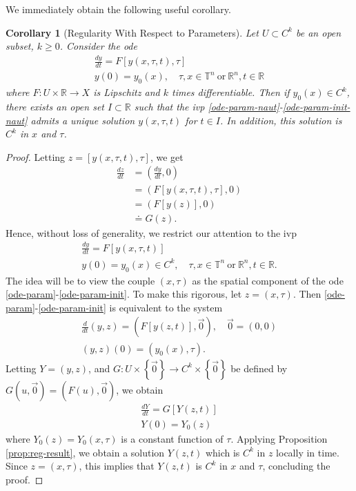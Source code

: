 \documentclass[12pt,reqno]{amsart}
\numberwithin{equation}{section}  %
\numberwithin{figure}{section}
\newcommand{\rr}{\mathbb{R}}
\newcommand{\ci}{\mathbb{T}}
\theoremstyle{plain}
\newtheorem{corollary}{Corollary}
\theoremstyle{definition}
\theoremstyle{remark}
\begin{document}
%
%
We immediately obtain the following useful corollary.
%
\begin{corollary}[Regularity With Respect to Parameters]
  \label{cor:reg-param}
  Let $U \subset C^{k}$ be an open subset, $ k \ge 0$.  
Consider the ode
\begin{gather}
  \label{ode-param-naut}
\frac{dy}{dt} = F \left [ y(x, \tau, t), \tau \right]
\\
y(0) = y_{0}(x), \quad \tau, x \in \ci^{n} \ \text{or} \ \rr^{n}, t \in \rr
\label{ode-param-init-naut}
\end{gather}
%
%
where $F: U \times \rr  \to X$ is Lipschitz and $k$ times differentiable. Then
if $y_{0}(x) \in C^{k}$, there exists an 
open set $I \subset \rr$
such that the ivp \eqref{ode-param-naut}-\eqref{ode-param-init-naut}
admits a unique solution $y(x, \tau, t)$ for $t \in I$. In addition,
this solution is $C^{k}$ in $x$ and $\tau$.
%
\end{corollary}
%
\begin{proof}
  Letting $z = \left[ y(x, \tau, t), \tau \right]$, we get
  \begin{equation*}
  \begin{split}
  \frac{dz}{dt}
  & = \left( \frac{dy}{dt}, 0 \right)
  \\
  & = \left( F\left[ y(x,\tau, t), \tau \right], 0 \right)
  \\
  & = \left( F[y(z)], 0 \right)
  \\
  & \doteq G(z).
  \end{split}
  \end{equation*}
  Hence, without loss of generality, we restrict our attention to the ivp
\begin{gather}
  \label{ode-param}
\frac{dy}{dt} = F \left [ y(x, \tau, t) \right]
\\
y(0) = y_{0}(x) \in C^{k}, \quad \tau, x \in \ci^{n} \ \text{or} \
\rr^{n}, t \in \rr.
\label{ode-param-init}
\end{gather}
  The idea will be to view the couple
  $(x, \tau)$ as the spatial component of the ode
  \eqref{ode-param}-\eqref{ode-param-init}.
  To make this rigorous, let $z = (x, \tau)$. Then
  \eqref{ode-param}-\eqref{ode-param-init} is equivalent to the system
  \begin{gather*}
    \frac{d}{dt}(y, z) = \left( F[y(z,t)], \vec{0} \right), \quad \vec 0 =
    (0, 0)
  \\
  (y, z)(0) = \left ( y_{0}(x), \tau \right ).
  \end{gather*}
  Letting $Y = (y,z)$, and $G: U \times \left\{ \vec{0} \right\} 
  \to C^{k} \times \left\{ \vec{0} \right\}$ be defined
  by $G(u, \vec{0}) = \left( F(u), \vec{0} \right)$, we obtain
  \begin{gather*}
      \frac{dY}{dt} = G\left[ Y(z,t) \right]
      \\
      Y(0) = Y_{0}(z)
  \end{gather*}
%
where $Y_{0}(z) = Y_{0}(x, \tau)$ is a constant function of $\tau$. 
Applying Proposition \ref{prop:reg-result}, we obtain a solution $Y(z,t)$ which is
$C^{k}$ in $z$ locally in time. Since $z = (x, \tau)$, this implies that $Y(z,t)$ is
$C^{k}$ in $x$ and $\tau$, concluding the proof. 
%
\end{proof}
\end{document}
